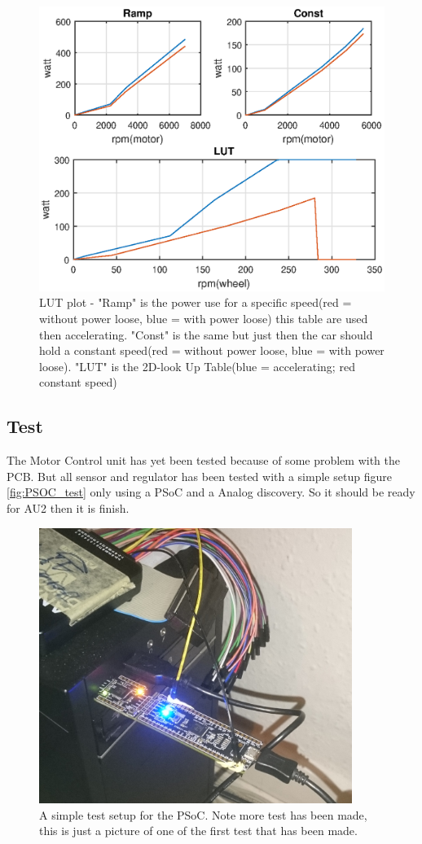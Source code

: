 \begin{figure}[H]
	\centering
	\includegraphics [width=6in]{SubPages/Images/LUT.eps}
	\caption{LUT plot - "Ramp" is the power use for a specific speed(red = without power loose, blue = with power loose) this table are used then accelerating. "Const" is the same but just then the car should hold a constant speed(red = without power loose, blue = with power loose). "LUT" is the 2D-look Up Table(blue = accelerating; red constant speed)}
	\label{fig:LUT_plot}
\end{figure}


\subsection{Test}

The Motor Control unit has yet been tested because of some problem with the PCB. But all sensor and regulator has been tested with a simple setup figure \vref{fig:PSOC_test} only using a PSoC and a Analog discovery. So it should be ready for AU2 then it is finish.

\begin{figure}[H]
	\centering
	\includegraphics [width=4in]{SubPages/Images/SoftwareTestPSoC.jpg}
	\caption{A simple test setup for the PSoC. Note more test has been made, this is just a picture of one of the first test that has been made.}
	\label{fig:PSOC_test}
\end{figure}

